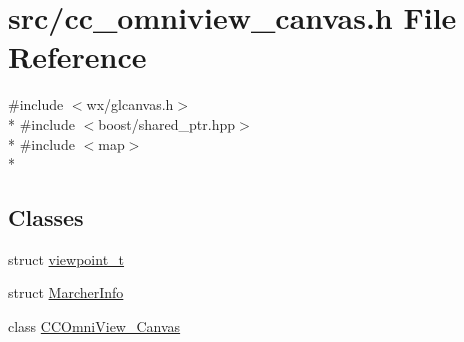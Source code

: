 \hypertarget{a00185}{\section{src/cc\-\_\-omniview\-\_\-canvas.h File Reference}
\label{a00185}
}
{\ttfamily \#include $<$wx/glcanvas.\-h$>$}\\*
{\ttfamily \#include $<$boost/shared\-\_\-ptr.\-hpp$>$}\\*
{\ttfamily \#include $<$map$>$}\\*
\subsection*{Classes}
\begin{DoxyCompactItemize}
\item 
struct \hyperlink{a00154}{viewpoint\-\_\-t}
\item 
struct \hyperlink{a00110}{Marcher\-Info}
\item 
class \hyperlink{a00049}{C\-C\-Omni\-View\-\_\-\-Canvas}
\end{DoxyCompactItemize}
